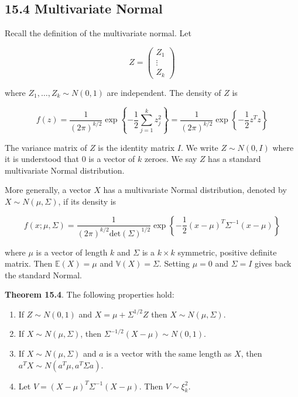 \subsection*{15.4 Multivariate Normal}\label{multivariate:normal}

Recall the definition of the multivariate normal. Let

\[ Z = \begin{pmatrix} Z_{1} \\ \vdots \\ Z_{k} \end{pmatrix} \]

where \(Z_{1}, \dots, Z_{k} \sim N(0, 1)\) are independent. The density of
\(Z\) is

\[ f(z) = \frac{1}{(2\pi)^{k / 2}} \exp \left\{ -\frac{1}{2} \sum_{j=1}^{k} z_{j}^{2} \right\} = \frac{1}{(2\pi)^{k / 2}} \exp \left\{ -\frac{1}{2} z^T z \right\}\]

The variance matrix of \(Z\) is the identity matrix \(I\). We write
\(Z \sim N(0, I)\) where it is understood that \(0\) is a vector of
\(k\) zeroes. We say \(Z\) has a standard multivariate Normal
distribution.

More generally, a vector \(X\) has a multivariate Normal distribution,
denoted by \(X \sim N(\mu, \Sigma)\), if its density is

\[ f(x; \mu, \Sigma) = \frac{1}{(2 \pi)^{k / 2} \text{det}(\Sigma)^{1/2}} \exp \left\{ -\frac{1}{2} (x - \mu)^T \Sigma^{-1} (x - \mu)\right\}\]

where \(\mu\) is a vector of length \(k\) and \(\Sigma\) is a
\(k \times k\) symmetric, positive definite matrix. Then
\(\mathbb{E}(X) = \mu\) and \(\mathbb{V}(X) = \Sigma\). Setting
\(\mu = 0\) and \(\Sigma = I\) gives back the standard Normal.

\textbf{Theorem 15.4}. The following properties hold:

\begin{enumerate}[label={\arabic*.}]
\item
  If \(Z \sim N(0, 1)\) and \(X = \mu + \Sigma^{1/2} Z\) then
  \(X \sim N(\mu, \Sigma)\).
\item
  If \(X \sim N(\mu, \Sigma)\), then
  \(\Sigma^{-1/2}(X - \mu) \sim N(0, 1)\).
\item
  If \(X \sim N(\mu, \Sigma)\) and \(a\) is a vector with the same
  length as \(X\), then \(a^T X \sim N(a^T \mu, a^T \Sigma a)\).
\item
  Let \(V = (X - \mu)^T \Sigma^{-1} (X - \mu)\). Then
  \(V \sim \xi_{k}^{2}\).
\end{enumerate}

